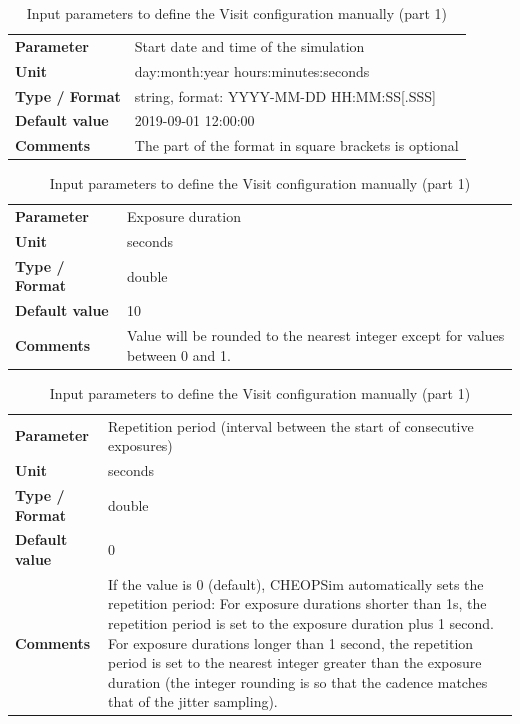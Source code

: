 \documentclass[11pt]{article}      %
\def\HCode#1{}
\def\htmlanchor#1{\HCode{<a id="#1"></a>}}
\begin{document}
\begin{table}[hb]
  \caption{Input parameters to define the Visit configuration manually (part 1)}

  \htmlanchor{startTime}
  \begin{tabular}{| l | p{13cm} |}
    \hline 
    {\bf Parameter} &  Start date and time of the simulation\\
    {\bf Unit} & day:month:year hours:minutes:seconds\\
    {\bf Type / Format} & string, format: YYYY-MM-DD HH:MM:SS[.SSS]\\
    {\bf Default value} & 2019-09-01 12:00:00\\
    {\bf Comments} & The part of the format in square brackets is optional\\
    \hline
  \end{tabular}
  \bigskip

  \htmlanchor{exposureTime}
  \begin{tabular}{| l | p{13cm} |}
    \hline
    {\bf Parameter} &  Exposure duration\\
    {\bf Unit} & seconds\\
    {\bf Type / Format} & double\\
    {\bf Default value} & 10\\
    {\bf Comments} & Value will be rounded to the nearest integer except for values between 0 and 1.\\
    \hline
  \end{tabular}
  \bigskip

  \htmlanchor{repetitionPeriod}
  \begin{tabular}{| l | p{13cm} |}
    \hline
    {\bf Parameter} &  Repetition period (interval between the start of consecutive exposures)\\
    {\bf Unit} & seconds\\
    {\bf Type / Format} & double\\
    {\bf Default value} & 0\\
    {\bf Comments} & If the value is 0 (default), CHEOPSim automatically sets the repetition period: For exposure durations shorter than 1s, the repetition period is set to the exposure duration plus 1 second. For  exposure durations longer than 1 second, the  repetition period is set to the nearest integer greater than the exposure duration (the integer rounding is so that the cadence matches that of the jitter sampling).\\
    \hline
  \end{tabular}
  \bigskip


\end{table}
\end{document}

